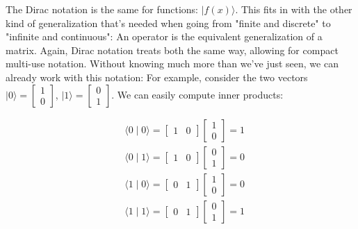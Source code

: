 \documentclass[main.tex]{subfiles}
\begin{document}
    The Dirac notation is the same for functions: $|f(x)\rangle$. This fits in with the other kind of generalization that's needed when going from "finite and discrete" to "infinite and continuous": An operator is the equivalent generalization of a matrix. Again, Dirac notation treats both the same way, allowing for compact multi-use notation. Without knowing much more than we've just seen, we can already work with this notation: For example, consider the two vectors $|0\rangle=\left[\begin{array}{l}1 \\ 0\end{array}\right]$, $|1\rangle=\left[\begin{array}{l}0 \\ 1\end{array}\right]$. We can easily compute inner products:
    
    $$
    \begin{aligned}
    &\langle 0 \mid 0\rangle=\left[\begin{array}{ll}
    1 & 0
    \end{array}\right]\left[\begin{array}{l}
    1 \\
    0
    \end{array}\right]=1 \\
    &\langle 0 \mid 1\rangle=\left[\begin{array}{ll}
    1 & 0
    \end{array}\right]\left[\begin{array}{l}
    0 \\
    1
    \end{array}\right]=0 \\
    &\langle 1 \mid 0\rangle=\left[\begin{array}{ll}
    0 & 1
    \end{array}\right]\left[\begin{array}{l}
    1 \\
    0
    \end{array}\right]=0 \\
    &\langle 1 \mid 1\rangle=\left[\begin{array}{ll}
    0 & 1
    \end{array}\right]\left[\begin{array}{l}
    0 \\
    1
    \end{array}\right]=1
    \end{aligned}
    $$
    
\end{document}
